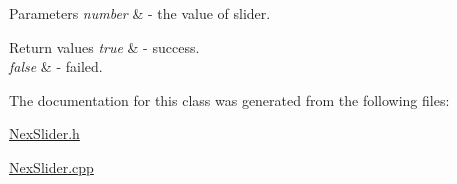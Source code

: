 \begin{DoxyParams}{Parameters}
{\em number} & -\/ the value of slider.\\
\hline
\end{DoxyParams}

\begin{DoxyRetVals}{Return values}
{\em true} & -\/ success. \\
\hline
{\em false} & -\/ failed. \\
\hline
\end{DoxyRetVals}


The documentation for this class was generated from the following files\+:\begin{DoxyCompactItemize}
\item 
\hyperlink{_nex_slider_8h}{Nex\+Slider.\+h}\item 
\hyperlink{_nex_slider_8cpp}{Nex\+Slider.\+cpp}\end{DoxyCompactItemize}
